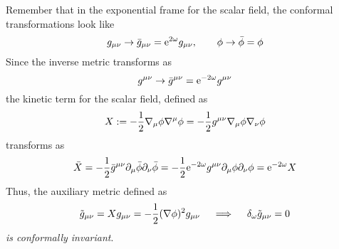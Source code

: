 Remember that in the exponential frame for the scalar field, the conformal transformations look like
\begin{equation}
  g_{\mu\nu }\to \bar{g}_{\mu\nu }= \mathrm{e}^{2\omega}g_{\mu\nu },\qquad \phi\to \bar{\phi }=\phi 
\end{equation}
Since the inverse metric transforms as
\begin{equation}
  g^{\mu\nu }\to \bar{g}^{\mu\nu }=\mathrm{e}^{-2\omega}g^{\mu\nu }
\end{equation}
the kinetic term for the scalar field, defined as
\begin{equation}
  X:=-\frac{1}{2}\nabla_\mu \phi \nabla^\mu \phi =-\frac{1}{2}g^{\mu\nu }\nabla_\mu \phi\nabla_\nu \phi 
\end{equation}
transforms as
\begin{equation}
  \bar{X}=-\frac{1}{2}\bar{g}^{\mu\nu }\partial_\mu \bar{\phi }\partial_\nu \bar{\phi }=-\frac{1}{2}\mathrm{e}^{-2\omega}g^{\mu\nu }\partial_\mu \phi\partial_\nu \phi =\mathrm{e}^{-2\omega}X
\end{equation}
Thus, the auxiliary metric defined as
\begin{equation}
  \tilde{g}_{\mu\nu }=Xg_{\mu\nu }=-\frac{1}{2}(\nabla\phi )^2g_{\mu\nu } \quad \implies\quad \delta_\omega\tilde{g}_{\mu\nu }=0
\end{equation}
\textit{is conformally invariant}.

